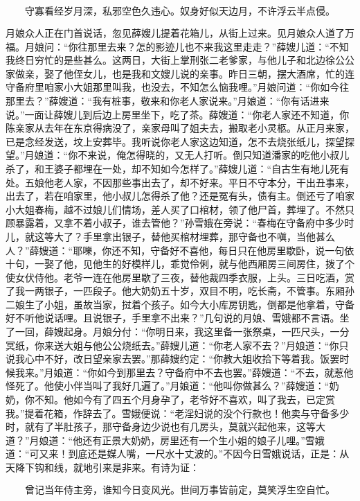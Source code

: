 \[
守寡看经岁月深，私邪空色久违心。
奴身好似天边月，不许浮云半点侵。
\]

月娘众人正在门首说话，忽见薛嫂儿提着花箱儿，从街上过来。见月娘众人道了万福。月娘问：“你往那里去来？怎的影迹儿也不来我这里走走？”薛嫂儿道：“不知我终日穷忙的是些甚么。这两日，大街上掌刑张二老爹家，与他儿子和北边徐公公家做亲，娶了他侄女儿，也是我和文嫂儿说的亲事。昨日三朝，摆大酒席，忙的连守备府里咱家小大姐那里叫我，也没去，不知怎么恼我哩。”月娘问道：“你如今往那里去？”薛嫂道：“我有桩事，敬来和你老人家说来。”月娘道：“你有话进来说。”一面让薛嫂儿到后边上房里坐下，吃了茶。薛嫂道：“你老人家还不知道，你陈亲家从去年在东京得病没了，亲家母叫了姐夫去，搬取老小灵柩。从正月来家，已是念经发送，坟上安葬毕。我听说你老人家这边知道，怎不去烧张纸儿，探望探望。”月娘道：“你不来说，俺怎得晓的，又无人打听。倒只知道潘家的吃他小叔儿杀了，和王婆子都埋在一处，却不知如今怎样了。”薛嫂儿道：“自古生有地儿死有处。五娘他老人家，不因那些事出去了，却不好来。平日不守本分，干出丑事来，出去了，若在咱家里，他小叔儿怎得杀了他？还是冤有头，债有主。倒还亏了咱家小大姐春梅，越不过娘儿们情场，差人买了口棺材，领了他尸首，葬埋了。不然只顾暴露着，又拿不着小叔子，谁去管他？”孙雪娥在旁说：“春梅在守备府中多少时儿，就这等大了？手里拿出银子，替他买棺材埋葬，那守备也不嗔，当他甚么人？”薛嫂道：“耶嚛，你还不知，守备好不喜他，每日只在他房里歇卧，说一句依十句，一娶了他，见他生的好模样儿，乖觉伶俐，就与他西厢房三间房住，拨了个使女伏侍他。老爷一连在他房里歇了三夜，替他裁四季衣服，上头。三日吃酒，赏了我一两银子，一匹段子。他大奶奶五十岁，双目不明，吃长斋，不管事。东厢孙二娘生了小姐，虽故当家，挝着个孩子。如今大小库房钥匙，倒都是他拿着，守备好不听他说话哩。且说银子，手里拿不出来？”几句说的月娘、雪娥都不言语。坐了一回，薛嫂起身。月娘分付：“你明日来，我这里备一张祭桌，一匹尺头，一分冥纸，你来送大姐与他公公烧纸去。”薛嫂儿道：“你老人家不去？”月娘道：“你只说我心中不好，改日望亲家去罢。”那薛嫂约定：“你教大姐收拾下等着我。饭罢时候我来。”月娘道：“你如今到那里去？守备府中不去也罢。”薛嫂道：“不去，就惹他怪死了。他使小伴当叫了我好几遍了。”月娘道：“他叫你做甚么？”薛嫂道：“奶奶，你不知。他如今有了四五个月身孕了，老爷好不喜欢，叫了我去，已定赏我。”提着花箱，作辞去了。雪娥便说：“老淫妇说的没个行款也！他卖与守备多少时，就有了半肚孩子，那守备身边少说也有几房头，莫就兴起他来，这等大道？”月娘道：“他还有正景大奶奶，房里还有一个生小姐的娘子儿哩。”雪娥道：“可又来！到底还是媒人嘴，一尺水十丈波的。”不因今日雪娥说话，正是：从天降下钩和线，就地引来是非来。有诗为证：

\[
曾记当年侍主旁，谁知今日变风光。
世间万事皆前定，莫笑浮生空自忙。
\]
